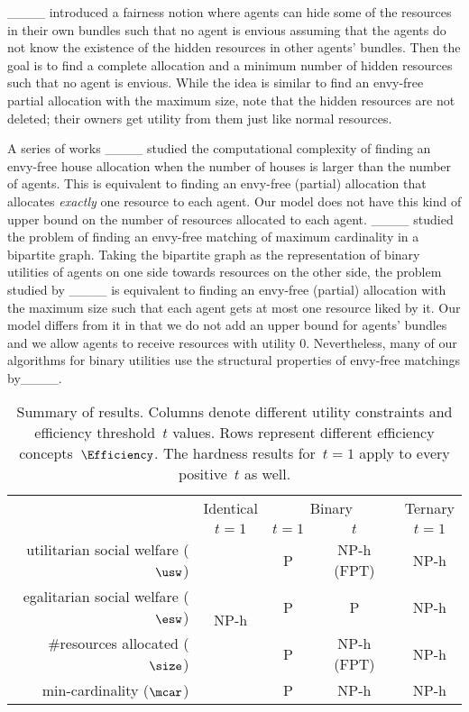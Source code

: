 	____ introduced a fairness notion where agents can hide some
	of the resources in their own bundles such that no agent is envious assuming
	that the agents do not know the existence of the hidden resources in other agents'
	bundles.  Then the goal is to find a complete allocation and a minimum number of
	hidden resources such that no agent is envious. While the idea is similar to
	find an envy-free partial allocation with the maximum size, note that the hidden
	resources are not deleted; their owners get utility from them just like normal
	resources.
	
	A series of works ____ studied the computational complexity of finding an envy-free house allocation when the number of houses is larger than the number of agents.
	This is equivalent to finding an envy-free (partial) allocation that allocates \emph{exactly} one resource to each agent. 
	Our model does not have this kind of upper bound on the number of resources allocated to each agent.
	____ studied the problem of finding an envy-free matching of maximum cardinality in a bipartite graph.
	Taking the bipartite graph as the representation of binary utilities of agents on one side towards resources on the other side, the problem studied by ____ is equivalent to finding an envy-free (partial) allocation with the maximum size such that each agent gets at most one resource liked by it.
	Our model differs from it in that we do not add an upper bound for agents' bundles and we allow agents to receive resources with utility 0.
	Nevertheless, many of our algorithms for binary utilities use the structural
	properties of envy-free matchings %
	by____.
	
	
	
	\begin{table*}[t]
		\caption{Summary of results. Columns denote different utility constraints and
			efficiency threshold~$t$ values.
			Rows represent different efficiency concepts~$\Efficiency$. The hardness
			results for~$t=1$ apply to every positive~$t$ as well.} \label{tab:results}
		\centering
		\renewcommand{\arraystretch}{1.25}
		\setlength{\tabcolsep}{12pt}
		\begin{tabular}{rcccc}
			\toprule
			& Identical & \multicolumn{2}{c}{Binary} &	Ternary \\ 
			\cmidrule(lr){3-4}
			& $t=1$  & $t=1$ & $t$ & $t=1$ \\\midrule
			utilitarian social welfare ($\usw$) & \multirow{4}{*}{NP-h} & P & NP-h (FPT) & NP-h \\ 
			egalitarian social welfare ($\esw$) & ~ & P & P & NP-h \\ 
			\#resources allocated ($\size$) & ~ & P & NP-h (FPT) & NP-h  \\ 
			min-cardinality ($\mcar$) & ~ & P & NP-h & NP-h \\ \bottomrule
		\end{tabular}      
	\end{table*}